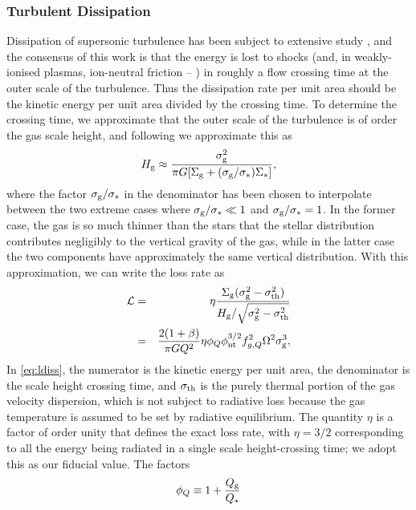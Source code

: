 \documentclass[useAMS,usenatbib]{mn2e}
\begin{document}
\subsubsection{Turbulent Dissipation}

Dissipation of supersonic turbulence has been subject to extensive study \citep{stone98a, mac-low98a, mac-low99b, lemaster09a}, and the consensus of this work is that the energy is lost to shocks (and, in weakly-ionised plasmas, ion-neutral friction -- \citealt{burkhart15a}) in roughly a flow crossing time at the outer scale of the turbulence. Thus the dissipation rate per unit area should be the kinetic energy per unit area divided by the crossing time. To determine the crossing time, we approximate that the outer scale of the turbulence is of order the gas scale height, and following \citet{forbes12a} we approximate this as
\begin{equation}
H_{\rm g} \approx \frac{\sigma_{\rm g}^2}{\pi G [\Sigma_{\rm g} + (\sigma_{\rm g}/\sigma_*)\Sigma_*]},
\end{equation}
where the factor $\sigma_{\rm g}/\sigma_*$ in the denominator has been chosen to interpolate between the two extreme cases where $\sigma_{\rm g}/\sigma_* \ll 1$ and $\sigma_{\rm g}/\sigma_* = 1$. In the former case,  the gas is so much thinner than the stars that the stellar distribution contributes negligibly to the vertical gravity of the gas, while in the latter case the two components have approximately the same vertical distribution. With this approximation, we can write the loss rate as
\begin{eqnarray}
\label{eq:ldiss}
\mathcal{L} & = & \eta\frac{\Sigma_{\rm g} (\sigma_{\rm g}^2-\sigma_{\rm th}^2)}{H_{\rm g}/\sqrt{\sigma_{\rm g}^2-\sigma_{\rm th}^2}}  \\
& = & \frac{2(1+\beta)}{\pi G  Q^2} \eta \phi_Q \phi_{\rm nt}^{3/2} f_{g,Q}^2 \Omega^2 \sigma_{\rm g}^3,
\label{eq:loss_rate}
\end{eqnarray}
In \autoref{eq:ldiss}, the numerator is the kinetic energy per unit area, the denominator is the scale height crossing time, and $\sigma_{\rm th}$ is the purely thermal portion of the gas velocity dispersion, which is not subject to radiative loss because the gas temperature is assumed to be set by radiative equilibrium. The quantity $\eta$ is a factor of order unity that defines the exact loss rate, with $\eta = 3/2$ corresponding to all the energy being radiated in a single scale height-crossing time; we adopt this as our fiducial value. The factors
\begin{equation}
\label{eq:phiQ}
\phi_Q \equiv 1 + \frac{Q_{\rm g}}{Q_*}
\end{equation}
\end{document}
